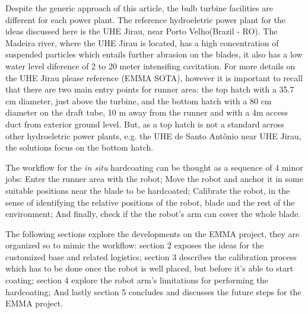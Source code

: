 Despite the generic approach of this article, the bulb turbine facilities are
different for each power plant. The reference hydroeletric power plant for the
ideas discussed here is the UHE Jirau, near Porto Velho(Brazil - RO). The
Madeira river, where the UHE Jirau is located, has a high concentration of
suspended particles which entails further abrasion on the blades, it also has a
low water level diference of 2 to 20 meter intensifing cavitation. For more
details on the UHE Jirau please reference (EMMA SOTA), however it is important
to recall that there are two main entry points for runner area: the top hatch
with a 35.7 cm diameter, just above the turbine, and the bottom hatch with a 80
cm diameter on the draft tube, 10 m away from the runner and with a 4m access
duct from exterior ground level. But, as a top hatch is not a standard across
other hydroeletric power plants, e.g. the UHE de Santo Antônio near UHE Jirau,
the solutions focus on the bottom hatch.

The workflow for the \textit{in situ} hardcoating can be thought as a
sequence of 4 minor jobs:
Enter the runner area with the robot; Move the robot and anchor it in some
suitable positions near the blade to be hardcoated; Calibrate the robot, in the
sense of identifying the relative positions of the robot, blade and the rest of
the environment; And finally, check if the the robot's arm can cover the whole
blade.

The following sections explore the developments on the EMMA project, they are
organized so to mimic the workflow:
section 2 exposes the ideas for the customized base and related logistics;
section 3 describes the calibration process which has to be done once the robot
is well placed, but before it's able to start coating; section 4 explore the
robot arm's limitations for performing the hardcoating; And lastly section 5
concludes and discusses the future steps for the EMMA project.



